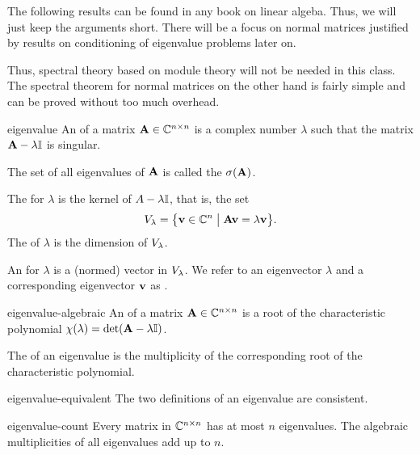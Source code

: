 \begin{intro}
  The following results can be found in any book on linear
  algeba. Thus, we will just keep the arguments short. There will be a
  focus on normal matrices justified by results on conditioning of
  eigenvalue problems later on.

  Thus, spectral theory based on module theory will not be needed in
  this class. The spectral theorem for normal matrices on the other
  hand is fairly simple and can be proved without too much overhead.
\end{intro}

\begin{Definition}{eigenvalue}
  An  of a matrix $\mathbf A\in \mathbb C^{n\times n}$ is a
  complex number $\lambda$ such that the matrix $\mathbf A-\lambda\mathbb I$ is
  singular.

  The set of all eigenvalues of $\mathbf A$ is called the
   $\sigma(\mathbf A)$.

  The  for $\lambda$ is the kernel of
  $A-\lambda\mathbb I$, that is, the set
\begin{gather}
    V_{\lambda} = \bigl\{
    \mathbf v \in \mathbb C^n \;\big\vert\;
    \mathbf A\mathbf v = \lambda\mathbf v \bigr\}.
\end{gather}
The  of $\lambda$ is the dimension of
$V_{\lambda}$.


An  for $\lambda$ is a (normed) vector in
$V_{\lambda}$. We refer to an eigenvector $\lambda$ and a
corresponding eigenvector $\mathbf v$ as .
\end{Definition}

\begin{Definition}{eigenvalue-algebraic}
  An  of a matrix $\mathbf A\in \mathbb C^{n\times n}$ is a root of the characteristic polynomial $\chi(\lambda) = \det(\mathbf A-\lambda\mathbb I)$.
  
  The  of an eigenvalue is the multiplicity of the corresponding root of the characteristic polynomial.
\end{Definition}

\begin{Lemma}{eigenvalue-equivalent}
  The two definitions of an eigenvalue are consistent.
\end{Lemma}

\begin{Theorem}{eigenvalue-count}
  Every matrix in $\mathbb C^{n\times n}$ has at most $n$ eigenvalues. The algebraic multiplicities of all eigenvalues add up to $n$.
\end{Theorem}

